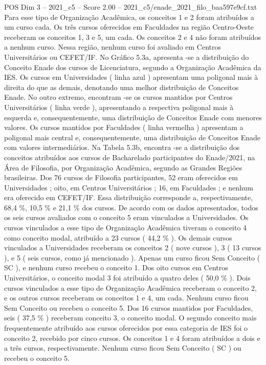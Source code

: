\begin{textsample}{POS Dim 3 – 2021\_c5 – Score 2.00 – 2021\_c5/enade\_2021\_filo\_baa597e9cf.txt}
Para esse tipo de Organização Acadêmica, os conceitos 1 e 2 foram atribuídos a um curso cada.
Os três cursos oferecidos em Faculdades na região Centro-Oeste receberam os conceitos 1, 3 e 5, um cada.
Os conceitos 2 e 4 não foram atribuídos a nenhum curso.
Nessa região, nenhum curso foi avaliado em Centros Universitários ou CEFET/IF.
No Gráfico 5.3a, apresenta -se a distribuição do Conceito Enade dos cursos de Licenciatura, segundo a Organização Acadêmica da IES.
Os cursos em Universidades ( linha azul ) apresentam uma poligonal mais à direita do que as demais, denotando uma melhor distribuição de Conceitos Enade.
No outro extremo, encontram -se os cursos mantidos por Centros Universitários ( linha verde ), apresentando a respectiva poligonal mais à esquerda e, consequentemente, uma distribuição de Conceitos Enade com menores valores.
Os cursos mantidos por Faculdades ( linha vermelha ) apresentam a poligonal mais central e, consequentemente, uma distribuição de Conceitos Enade com valores intermediários.
Na Tabela 5.3b, encontra -se a distribuição dos conceitos atribuídos aos cursos de Bacharelado participantes do Enade/2021, na Área de Filosofia, por Organização Acadêmica, segundo as Grandes Regiões brasileiras.
Dos 76 cursos de Filosofia participantes, 52 eram oferecidos em Universidades ; oito, em Centros Universitários ; 16, em Faculdades ; e nenhum era oferecido em CEFET/IF.
Essa distribuição corresponde a, respectivamente, 68,4 \%, 10,5 \% e 21,1 \% dos cursos.
De acordo com os dados apresentados, todos os seis cursos avaliados com o conceito 5 eram vinculados a Universidades.
Os cursos vinculados a esse tipo de Organização Acadêmica tiveram o conceito 4 como conceito modal, atribuído a 23 cursos ( 44,2 \% ).
Os demais cursos vinculados a Universidades receberam os conceitos 2 ( nove cursos ), 3 ( 13 cursos ), e 5 ( seis cursos, como já mencionado ).
Apenas um curso ficou Sem Conceito ( SC ), e nenhum curso recebeu o conceito 1.
Dos oito cursos em Centros Universitários, o conceito modal 3 foi atribuído a quatro deles ( 50,0 \% ).
Dois cursos vinculados a esse tipo de Organização Acadêmica receberam o conceito 2, e os outros cursos receberam os conceitos 1 e 4, um cada.
Nenhum curso ficou Sem Conceito ou recebeu o conceito 5.
Dos 16 cursos mantidos por Faculdades, seis ( 37,5 \% ) receberam conceito 3, o conceito modal.
O segundo conceito mais frequentemente atribuído aos cursos oferecidos por essa categoria de IES foi o conceito 2, recebido por cinco cursos.
Os conceitos 1 e 4 foram atribuídos a dois e a três cursos, respectivamente.
Nenhum curso ficou Sem Conceito ( SC ) ou recebeu o conceito 5.

\end{textsample}
